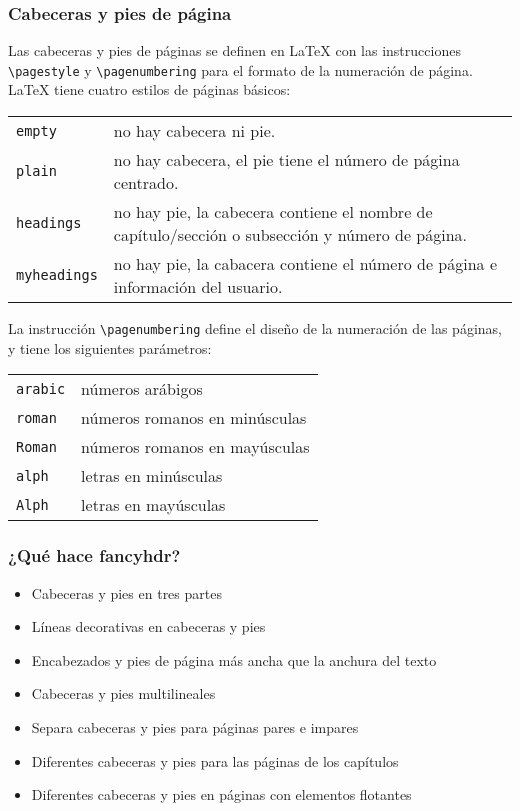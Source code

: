  
		
		\begin{center}
    		\layout
		\end{center}


		
		\subsubsection{Cabeceras y pies de página}
		Las cabeceras y pies de páginas se definen en \LaTeX{} con las instrucciones \verb+\pagestyle+ y \verb+\pagenumbering+ para el formato de la numeración de página.
		\LaTeX{} tiene cuatro estilos de páginas básicos:\\


		\begin{tabular}{lp{10cm}}
		\verb+empty+ & no hay cabecera ni pie. \\
		\verb+plain+ & no hay cabecera, el pie tiene el número de página centrado.\\
		\verb+headings+ & no hay pie, la cabecera contiene el nombre de capítulo/sección o subsección y número de página.\\
		\verb+myheadings+ & no hay pie, la cabacera contiene el número de página e información del usuario.\\
		\end{tabular}

		La instrucción \verb+\pagenumbering+ define el diseño de la numeración de las páginas, y tiene los siguientes parámetros:\\

		\begin{tabular}{ll}
			\verb+arabic+ & números arábigos \\
			\verb+roman+ & números romanos en minúsculas \\
			\verb+Roman+ & números romanos en mayúsculas \\
			\verb+alph+ & letras en minúsculas \\
			\verb+Alph+ & letras en mayúsculas
		\end{tabular}

		\subsubsection{¿Qué hace \textsf{fancyhdr}?}
		\begin{itemize}
 			\item Cabeceras y pies en tres partes
			\item Líneas decorativas en cabeceras y pies
			\item Encabezados y pies de página más ancha que la anchura del texto
			\item Cabeceras y pies multilineales
			\item Separa cabeceras y pies para páginas pares e impares
			\item Diferentes cabeceras y pies para las páginas de los capítulos
			\item Diferentes cabeceras y pies en páginas con elementos flotantes
		\end{itemize}
		
